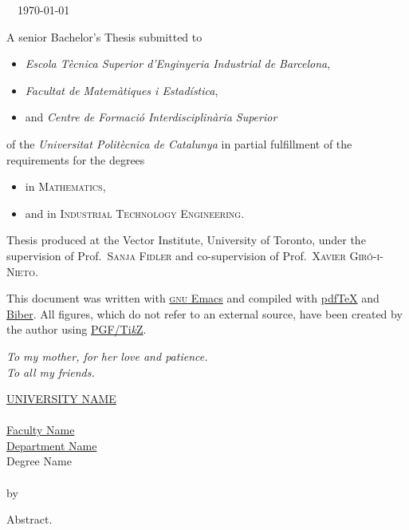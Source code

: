 \thispagestyle{plain}
\small
\null\vfill

\noindent\makeatletter\@author\makeatother\ \textcopyright\ \today
\begin{sloppypar}
  \noindent\makeatletter\texttt{\@title}\makeatother
\end{sloppypar}\medskip

\noindent A senior Bachelor's Thesis submitted to
\begin{itemize}
  \item \textsl{Escola Tècnica Superior d'Enginyeria Industrial de Barcelona},
  \item \textsl{Facultat de Matemàtiques i Estadística},
  \item and \textsl{Centre de Formació Interdisciplinària Superior}
\end{itemize}
of the \textit{Universitat Politècnica de Catalunya} in partial fulfillment of
the requirements for the degrees
\begin{itemize}
  \item in \textsc{Mathematics},
  \item and in \textsc{Industrial Technology Engineering}.
\end{itemize}

\noindent Thesis produced at the Vector Institute, University of Toronto, under
the supervision of Prof.\ \textsc{Sanja Fidler} and co-supervision of Prof.\
\textsc{Xavier Giró-i-Nieto}.\medskip

\noindent This document was written with
\href{https://www.gnu.org/software/emacs/}{\textsc{gnu} Emacs} and compiled
with \href{http://tug.org/applications/pdftex/}{pdf\TeX{}} and
\href{http://biblatex-biber.sourceforge.net/}{Biber}. All figures, which do not
refer to an external source, have been created by the author using
\href{https://www.ctan.org/pkg/pgf}{PGF/Ti\emph{k}Z}.

\doclicenseThis
\normalsize


\cleardoublepage
\thispagestyle{empty}
\begin{flushright}
  \itshape
  To my mother, for her love and patience. \\
  To all my friends.
\end{flushright}


\cleardoublepage
\thispagestyle{plain}
\null\vfill
\begin{center}
  \makeatletter
  \MakeUppercase{\href{https://href.com}{University Name}} \\
  \vspace{20pt}
  {\huge \textit{\abstractname}} \\
  \bigskip
  \href{https://href.com}{Faculty Name} \\
  \href{https://href.com}{Department Name} \\
  \bigskip
  Degree Name \\
  \bigskip
  \textbf{\@title} \\
  \medskip
  by \@author \\
  \bigskip
  \makeatother
\end{center}
Abstract.
\vfill\null


